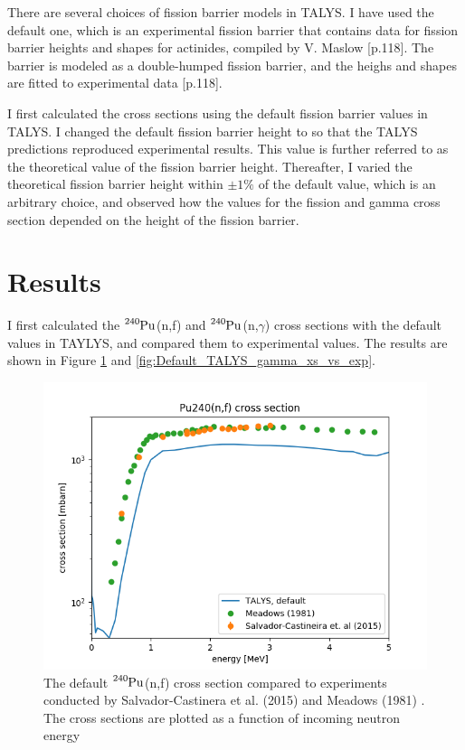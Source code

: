 \documentclass[]{article}
\begin{document}
\noindent There are several choices of fission barrier models in TALYS. I have used the default one, which is an experimental fission barrier that contains data for fission barrier heights and shapes for actinides, compiled by V. Maslow \cite{TALYSmanual} [p.118]. The barrier is modeled as a double-humped fission barrier, and the heighs  and shapes are fitted to experimental data \cite{TALYSmanual} [p.118]. 

\par 
\vspace{3mm}


\noindent I first calculated the cross sections using the default fission barrier values in TALYS. I changed the default fission barrier height to so that the TALYS predictions reproduced experimental results. This value is further referred to as the theoretical value of the fission barrier height. Thereafter, I varied the theoretical fission barrier height within $\pm 1 \%$ of the default value, which is an arbitrary choice, and observed how the values for the fission and gamma cross section depended on the height of the fission barrier.

\section{Results}

\noindent I first calculated the  $\ce{^{240}Pu}$(n,f) and $\ce{^{240}Pu}$(n,$\gamma$) cross sections with the default values in TAYLYS, and compared them to experimental values. The results are shown in Figure \ref{fig:Default_TALYS_fission_xs_to_exp} and \ref{fig:Default_TALYS_gamma_xs_vs_exp}. 

  \begin{figure} [H]
	\centering
	\includegraphics[scale=0.7]{Default_TALYS_fission_xs_to_exp.png}
	\caption{The default $\ce{^{240}Pu}$(n,f) cross section compared to experiments conducted by Salvador-Castinera et al. (2015) \cite{SALVADORCASTINEIRA2015177} and Meadows (1981) \cite{Meadows198}. The cross sections are plotted as a function of incoming neutron energy }
	\label{fig:Default_TALYS_fission_xs_to_exp}
\end{figure}
\end{document}
